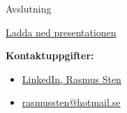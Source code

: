 \documentclass[presentation]{beamer}
\begin{document}
\begin{frame}{Avslutning}

  \href{https://github.com/anatar-the-fair/presentation_studytech}{Ladda ned presentationen}

  \textbf{Kontaktuppgifter:}
  \begin{itemize}
    \item \href{https://www.linkedin.com/in/rasmus-sten-788648235/}{LinkedIn, Rasmus Sten}
    \item \href{mailto:rasmussten@hotmail.se}{rasmussten@hotmail.se}
  \end{itemize}

\end{frame}
\end{document}
